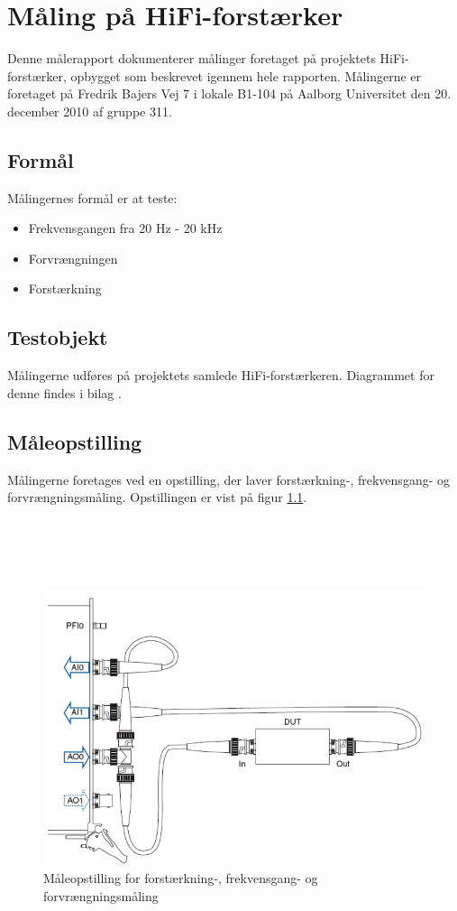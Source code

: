 \chapter{Måling på HiFi-forstærker}
\label{maaling_hifi}
Denne målerapport dokumenterer målinger foretaget på projektets HiFi-forstærker, opbygget som beskrevet igennem hele rapporten. Målingerne er foretaget på Fredrik Bajers Vej 7 i lokale B1-104 på Aalborg Universitet den 20. december 2010 af gruppe 311.

\section*{Formål}
Målingernes formål er at teste:

\begin{itemize}
\item Frekvensgangen fra 20 Hz - 20 kHz
\item Forvrængningen
\item Forstærkning
\end{itemize}

\section*{Testobjekt}
Målingerne udføres på projektets samlede HiFi-forstærkeren. Diagrammet for denne findes i bilag \cite{hifi-forstaerker-diagram}.%

\section*{Måleopstilling}
Målingerne foretages   ved en opstilling, der laver forstærkning-, frekvensgang- og forvrængningsmåling. Opstillingen er vist på figur \ref{fig:maaleop-hifi}.\\\\\\\\\\

\begin{figure}[h]
\centering
\includegraphics[scale=0.3]{maalerapporter/forforstaerker/maaleopstilling-thd-forforstaerker.png}
\caption{Måleopstilling for forstærkning-, frekvensgang- og forvrængningsmåling \cite{maaling-mm5}}
\label{fig:maaleop-hifi}
\end{figure}

